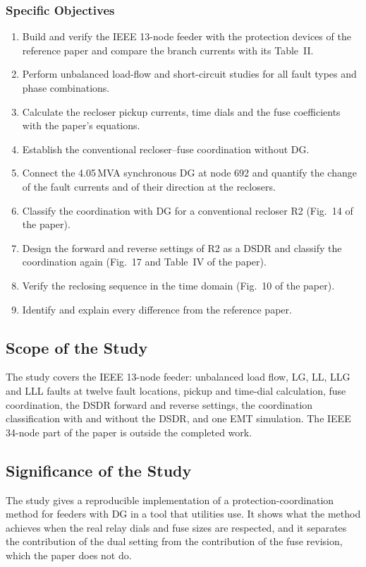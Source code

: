 \documentclass[12pt,letterpaper]{article}
\begin{document}
\subsubsection{Specific Objectives}
\begin{enumerate}
\item Build and verify the IEEE 13-node feeder with the protection devices of the reference paper and compare
      the branch currents with its Table~II.
\item Perform unbalanced load-flow and short-circuit studies for all fault types and phase combinations.
\item Calculate the recloser pickup currents, time dials and the fuse coefficients with the paper's equations.
\item Establish the conventional recloser--fuse coordination without DG.
\item Connect the 4.05\,MVA synchronous DG at node 692 and quantify the change of the fault currents and of
      their direction at the reclosers.
\item Classify the coordination with DG for a conventional recloser R2 (Fig.~14 of the paper).
\item Design the forward and reverse settings of R2 as a DSDR and classify the coordination again
      (Fig.~17 and Table~IV of the paper).
\item Verify the reclosing sequence in the time domain (Fig.~10 of the paper).
\item Identify and explain every difference from the reference paper.
\end{enumerate}

\subsection{Scope of the Study}
The study covers the IEEE 13-node feeder: unbalanced load flow, LG, LL, LLG and LLL faults at twelve fault
locations, pickup and time-dial calculation, fuse coordination, the DSDR forward and reverse settings, the
coordination classification with and without the DSDR, and one EMT simulation. The IEEE 34-node part of
the paper is outside the completed work.

\subsection{Significance of the Study}
The study gives a reproducible implementation of a protection-coordination method for feeders with DG in a
tool that utilities use. It shows what the method achieves when the real relay dials and fuse sizes are
respected, and it separates the contribution of the dual setting from the contribution of the fuse revision,
which the paper does not do.
\end{document}
